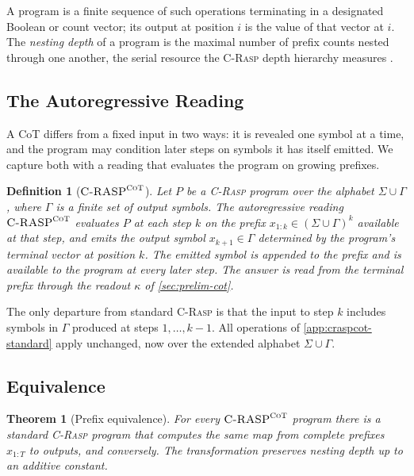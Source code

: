 \documentclass[11pt]{article}
\newtheorem{definition}{Definition}
\newtheorem{theorem}{Theorem}
\newcommand{\stepk}{k}
\newcommand{\CRASPCoT}{\textsc{C-RASP}^{\textsc{CoT}}}
\begin{document}
A program is a finite sequence of such operations terminating in a designated
Boolean or count vector; its output at position $i$ is the value of that vector
at $i$. The \emph{nesting depth} of a program is the maximal number of prefix
counts nested through one another, the serial resource the \textsc{C-Rasp}
depth hierarchy measures \citep{DBLP:conf/nips/YangCCN25}.

\subsection{The Autoregressive Reading}
\label{app:craspcot-auto}

A CoT differs from a fixed input in two ways: it is revealed one
symbol at a time, and the program may condition later steps on symbols it has
itself emitted. We capture both with a reading that evaluates the program on
growing prefixes.

\begin{definition}[$\CRASPCoT$]
\label{def:craspcot}
Let $P$ be a \textsc{C-Rasp} program over the alphabet $\Sigma\cup\Gamma$, where
$\Gamma$ is a finite set of output symbols. The \emph{autoregressive reading}
$\CRASPCoT$ evaluates $P$ at each step $\stepk$ on the prefix
$x_{1{:}\stepk}\in(\Sigma\cup\Gamma)^{\stepk}$ available at that step, and emits
the output symbol $x_{\stepk+1}\in\Gamma$ determined by the program's terminal
vector at position $\stepk$. The emitted symbol is appended to the prefix and is
available to the program at every later step. The \emph{answer} is read from the
terminal prefix through the readout $\kappa$ of \cref{sec:prelim-cot}.
\end{definition}

The only departure from standard \textsc{C-Rasp} is that the input to step
$\stepk$ includes symbols in $\Gamma$ produced at steps $1,\dots,\stepk-1$. All
operations of \cref{app:craspcot-standard} apply unchanged, now over the
extended alphabet $\Sigma\cup\Gamma$.

\subsection{Equivalence}
\label{app:craspcot-equiv}

\begin{theorem}[Prefix equivalence]
\label{thm:craspcot-equiv}
For every $\CRASPCoT$ program there is a standard \textsc{C-Rasp} program that
computes the same map from complete prefixes $x_{1{:}T}$ to outputs, and
conversely. The transformation preserves nesting depth up to an additive
constant.
\end{theorem}
\end{document}
